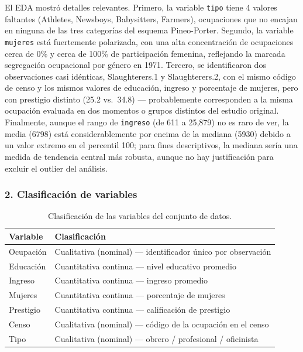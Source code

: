 \documentclass[11pt]{article}
\begin{document}
El EDA mostró detalles relevantes. Primero, la variable \texttt{tipo} tiene 4 valores faltantes (Athletes, Newsboys, Babysitters, Farmers), ocupaciones que no encajan en ninguna de las tres categorías del esquema Pineo-Porter. Segundo, la variable \texttt{mujeres} está fuertemente polarizada, con una alta concentración de ocupaciones cerca de 0\% y cerca de 100\% de participación femenina, reflejando la marcada segregación ocupacional por género en 1971. Tercero, se identificaron dos observaciones casi idénticas, Slaughterers.1 y Slaughterers.2, con el mismo código de censo y los mismos valores de educación, ingreso y porcentaje de mujeres, pero con prestigio distinto (25.2 vs.\ 34.8) --- probablemente corresponden a la misma ocupación evaluada en dos momentos o grupos distintos del estudio original. Finalmente, aunque el rango de \texttt{ingreso} (de 611 a 25{,}879) no es raro de ver, la media (6798) está considerablemente por encima de la mediana (5930) debido a un valor extremo en el percentil 100; para fines descriptivos, la mediana sería una medida de tendencia central más robusta, aunque no hay justificación para excluir el outlier del análisis.

\subsubsection*{2. Clasificación de variables}

\begin{table}[H]
\centering
\caption{Clasificación de las variables del conjunto de datos.}
\begin{tabular}{ll}
\toprule
Variable & Clasificación \\
\midrule
Ocupación & Cualitativa (nominal) --- identificador único por observación \\
Educación & Cuantitativa continua --- nivel educativo promedio \\
Ingreso & Cuantitativa continua --- ingreso promedio \\
Mujeres & Cuantitativa continua --- porcentaje de mujeres \\
Prestigio & Cuantitativa continua --- calificación de prestigio \\
Censo & Cualitativa (nominal) --- código de la ocupación en el censo \\
Tipo & Cualitativa (nominal) --- obrero / profesional / oficinista \\
\bottomrule
\end{tabular}
\end{table}
\end{document}
